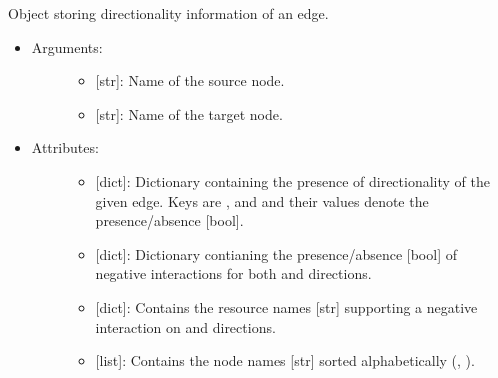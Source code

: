 \documentclass[letterpaper,10pt,english]{sphinxmanual}
\begin{document}
\begin{fulllineitems}
\label{\detokenize{main:pypath.main.Direction}}
Object storing directionality information of an edge.
\begin{itemize}
\item {} \begin{description}
\item[{Arguments:}] \leavevmode\begin{itemize}
\item {} 
 {[}str{]}: Name of the source node.

\item {} 
 {[}str{]}: Name of the target node.

\end{itemize}

\end{description}

\item {} \begin{description}
\item[{Attributes:}] \leavevmode\begin{itemize}
\item {} 
 {[}dict{]}: Dictionary containing the presence of
directionality of the given edge. Keys are ,
 and  and their values denote the
presence/absence {[}bool{]}.

\item {} 
 {[}dict{]}: Dictionary contianing the presence/absence
{[}bool{]} of negative interactions for both  and
 directions.

\item {} 
 {[}dict{]}: Contains the resource names {[}str{]}
supporting a negative interaction on  and
 directions.

\item {} 
 {[}list{]}: Contains the node names {[}str{]} sorted
alphabetically (, ).


\end{itemize}
\end{description}
\end{itemize}
\end{fulllineitems}
\end{document}
